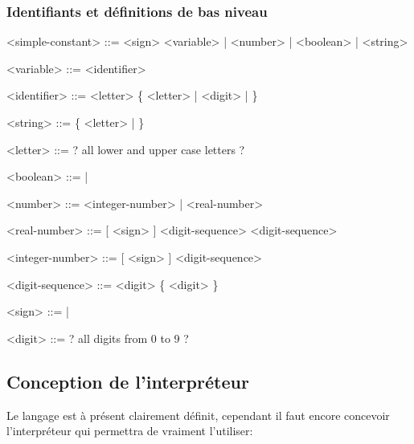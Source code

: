 \documentclass[french]{article}
\begin{document}
			\subsubsection{Identifiants et définitions de bas niveau}
				\begin{grammar}
					<simple-constant> ::= <sign> <variable> | <number> | <boolean> | <string>
					
					<variable> ::= <identifier>
					
					<identifier> ::= <letter> \{ <letter> | <digit> | \lit{\_} \}
					
					<string> ::=  \{ <letter> | \lit{ } \} 
					
					<letter> ::= ? all lower and upper case letters ? 
					
					<boolean> ::=  | 
					
					<number> ::= <integer-number> | <real-number>
					
					<real-number> ::= [ <sign> ] <digit-sequence>  <digit-sequence>
					
					<integer-number> ::= [ <sign> ] <digit-sequence>
					
					<digit-sequence> ::= <digit> \{ <digit> \}
					
					<sign> ::= \lit{+} | \lit{-} 
					
					<digit> ::= ? all digits from 0 to 9 ? 
				\end{grammar}
			
		\subsection{Conception de l'interpréteur}
			Le langage est à présent clairement définit, cependant il faut encore concevoir l'interpréteur qui permettra de vraiment l'utiliser:
			
\end{document}
